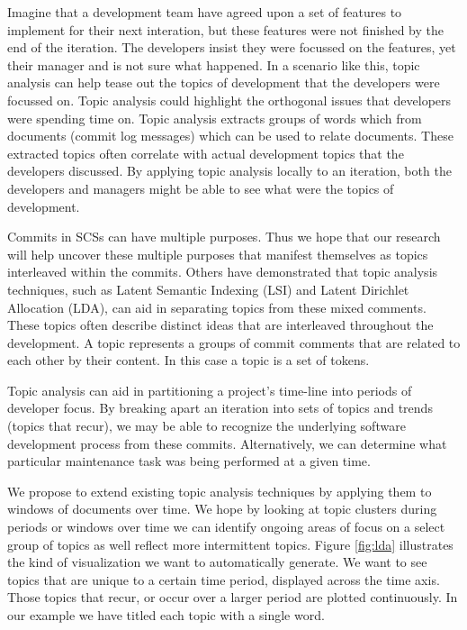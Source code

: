 \documentclass[times, 10pt,twocolumn]{article}
\begin{document}
Imagine that a development team have agreed upon a set of features to
implement for their next interation, but these features were not
finished by the end of the iteration. The developers insist they were
focussed on the features, yet their manager and is not sure what
happened. In a scenario like this, topic analysis can help tease out
the topics of development that the developers were focussed on. Topic
analysis could highlight the orthogonal issues that developers were
spending time on.  Topic analysis extracts groups of words which from
documents (commit log messages) which can be used to relate
documents. These extracted topics often correlate with actual
development topics that the developers discussed. By applying topic
analysis locally to an iteration, both the developers and managers
might be able to see what were the topics of development.


Commits in SCSs can have
multiple purposes. Thus we hope that our research will help uncover
these multiple purposes that manifest themselves as topics interleaved
within the commits.  Others have demonstrated that 
topic analysis techniques, such as Latent Semantic Indexing (LSI) and
Latent Dirichlet Allocation (LDA), can aid in separating topics from
these mixed comments. These topics often describe distinct ideas that
are interleaved throughout the development. A topic represents a
groups of commit comments that are related to each other by their
content.  In this case a topic is a set of tokens.



Topic analysis can aid in partitioning a project's
time-line into periods of developer focus. By breaking apart an
iteration into sets of topics and trends (topics that recur), we may
be able to recognize the underlying software development process from
these commits. Alternatively, we can determine what particular
maintenance task was being performed at a given time.

We propose to extend existing topic analysis techniques by
applying them to windows of documents over time. We hope by looking
at topic clusters during periods or windows over time we can identify
ongoing areas of focus on a select group of topics as well reflect more intermittent topics. Figure \ref{fig:lda} illustrates
the kind of visualization we want to automatically generate. We want
to see topics that are unique to a certain time period, displayed
across the time axis. Those topics that recur, or occur over a
larger period are plotted continuously. In our example we have
titled each topic with a single word.
\end{document}
